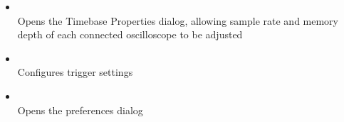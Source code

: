 \begin{itemize}


\item {}\\
Opens the Timebase Properties dialog, allowing sample rate and memory depth of each connected oscilloscope to be
adjusted

\item {}\\
Configures trigger settings


\item {}\\
Opens the preferences dialog

\end{itemize}

\begin{comment}

\begin{tabularx}{16cm}{llX}
\thickhline
\textbf{Name} & \textbf{Colors} & \textbf{Notes} \\
\thickhline
CRT & \texttt{[image: images/eye-gradient-crt.png]} & Similar to a major vendor's color scheme.\\
Grayscale & \texttt{[image: images/eye-gradient-grayscale.png]} & Common monochrome palette.\\
Ironbow & \texttt{[image: images/eye-gradient-ironbow.png]} & Common "hot metal" palette. \\
KRain & \texttt{[image: images/eye-gradient-krain.png]} & Similar to a major vendor's color scheme.\\
Rainbow & \texttt{[image: images/eye-gradient-rainbow.png]} & Common HSV rainbow palette. \\
Reverse Rainbow & \texttt{[image: images/eye-gradient-reverse-rainbow.png]} & Common HSV rainbow palette. \\
Viridis & \texttt{[image: images/eye-gradient-viridis.png]} & Perceptually uniform palette from matplotlib. \\
\thickhline
\end{tabularx}

\end{comment}

